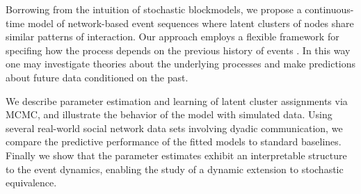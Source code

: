 %

Borrowing from the intuition of stochastic blockmodels, we propose a continuous-time model of network-based event sequences where latent clusters of nodes share similar patterns of interaction.
Our approach employs a flexible framework for  specifing how the process depends on the previous history of events \cite{AalenOddO.2008, Butts2008}.
In this way one may investigate theories about the underlying processes and make predictions about future data conditioned on the past.

We describe parameter estimation and learning of  latent cluster assignments via MCMC, and illustrate the behavior of the model  with simulated data.
Using several real-world social network data sets involving dyadic communication, we compare the predictive performance of the fitted models to standard baselines.
Finally we show that the parameter estimates exhibit an interpretable structure to the event dynamics, enabling the study of a dynamic extension to stochastic equivalence.

